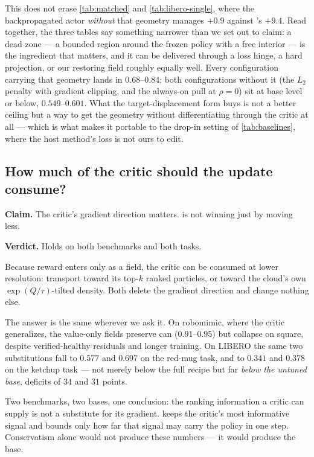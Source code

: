 This does not erase \cref{tab:matched} and \cref{tab:libero-single}, where
the backpropagated actor \emph{without} that geometry manages $+0.9$ against
\method{}'s $+9.4$. Read together, the three tables say something narrower
than we set out to claim: a dead zone --- a bounded region around the frozen
policy with a free interior --- is the ingredient that matters, and it can be
delivered through a loss hinge, a hard projection, or our restoring field
roughly equally well. Every configuration carrying that geometry lands in
$0.68$--$0.84$; both configurations without it (the $L_2$ penalty with
gradient clipping, and the always-on pull at $\rho{=}0$) sit at base level or
below, $0.549$--$0.601$. What the target-displacement form buys is not a
better ceiling but a way to get the geometry without differentiating through
the critic at all --- which is what makes it portable to the drop-in setting
of \cref{tab:baselines}, where the host method's loss is not ours to edit.

\subsection{How much of the critic should the update consume?}
\label{sec:exp-resolution}

\textbf{Claim.} The critic's gradient direction matters. \method{} is not
winning just by moving less.

\textbf{Verdict.} Holds on both benchmarks and both tasks.

Because reward enters only as a field, the critic can be consumed at lower
resolution: transport toward its top-$k$ ranked particles, or toward the
cloud's own $\exp(Q/\tau)$-tilted density. Both delete the gradient
direction and change nothing else.



The answer is the same wherever we ask it. On robomimic, where the critic
generalizes, the value-only fields preserve can ($0.91$--$0.95$) but
collapse on square, despite verified-healthy residuals and longer training.
On LIBERO the same two substitutions fall to $0.577$ and $0.697$ on the red-mug task, and
to $0.341$ and $0.378$ on the ketchup task --- not merely below the full recipe but far
\emph{below the untuned base}, deficits of $34$ and $31$ points.

Two benchmarks, two bases, one conclusion: the ranking information a critic
can supply is not a substitute for its gradient. \method{} keeps the
critic's most informative signal and bounds only how far that signal may
carry the policy in one step. Conservatism alone would not produce these
numbers --- it would produce the base.

